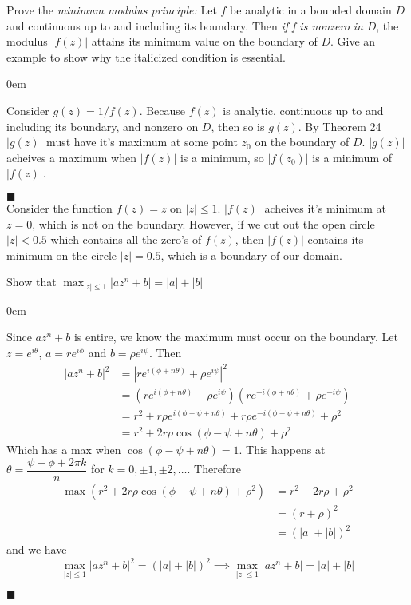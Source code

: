 \documentclass[12pt]{article}
\author{Warren Atkison}
\date{\today}
\renewcommand{\qed}{\hfill$\blacksquare$}
\renewenvironment{proof}{\vspace{1em}\begin{addmargin}[2em]{0em}\begin{newproof}}{\end{newproof}\end{addmargin}\qed}
\newenvironment{exercise}[2][Exercise]{\begin{trivlist}
\item[\hskip \labelsep {\bfseries #1} \hskip \labelsep {\bfseries #2.}]}{\end{trivlist}}
\begin{document}
\fancyhf{}
\fancyhead[R]{\today}
\fancyfoot[R]{\thepage}

\begin{exercise}{4.6.14}
	Prove the \textit{minimum modulus principle:} Let $f$ be analytic in a bounded domain $D$ and continuous up to and including its boundary. Then \textit{if f is nonzero in} $D$, the modulus $|f(z)|$ attains its minimum value on the boundary of $D$. Give an example to show why the italicized condition is essential.
\end{exercise}
\begin{proof}
	Consider $g(z) = 1/f(z)$. Because $f(z)$ is analytic, continuous up to and including its boundary, and nonzero on $D$, then so is $g(z)$. By Theorem 24 $|g(z)|$ must have it's maximum at some point $z_0$ on the boundary of $D$. $|g(z)|$ acheives a maximum when $|f(z)|$ is a minimum, so $|f(z_0)|$ is a minimum of $|f(z)|$.
\end{proof} \\
Consider the function $f(z) = z$ on $|z| \le 1$. $|f(z)|$ acheives it's minimum at $z = 0$, which is not on the boundary. However, if we cut out the open circle $|z| < 0.5$ which contains all the zero's of $f(z)$, then $|f(z)|$ contains its minimum on the circle $|z| = 0.5$, which is a boundary of our domain.
\begin{exercise}{4.6.16}
	Show that $\max_{|z| \le 1} |az^n + b| = |a| + |b|$
\end{exercise}
\begin{proof}
	Since $az^n + b$ is entire, we know the maximum must occur on the boundary. Let $z = e^{i\theta}$, $a = re^{i\phi}$ and $b = \rho e^{i\psi}$. Then
	\begin{align*}
		|az^n + b|^2 &= |re^{i(\phi + n\theta)} + \rho e^{i\psi}|^2 \\
			     &= (re^{i(\phi + n\theta)} + \rho e^{i\psi})(re^{-i(\phi + n\theta)} + \rho e^{-i\psi}) \\
			     &= r^2 + r\rho e^{i(\phi - \psi + n\theta)} + r\rho e^{-i(\phi - \psi + n\theta)} + \rho^2 \\
			     &= r^2 + 2r\rho \cos(\phi - \psi + n\theta) + \rho^2
	\end{align*}
	Which has a max when $\cos(\phi - \psi + n\theta) = 1$. This happens at $\theta = \dfrac{\psi - \phi + 2\pi k}{n}$ for $k=0,\pm1,\pm2,\ldots$. Therefore
	\begin{align*}
		\max (r^2 + 2r\rho \cos(\phi - \psi + n\theta) + \rho^2) &= r^2 + 2r\rho + \rho^2 \\
									 &= (r + \rho)^2 \\
									 &= (|a| + |b|)^2
	\end{align*}
	and we have
	\[
		\max_{|z| \le 1} |az^n + b|^2 = (|a| + |b|)^2 \implies \max_{|z| \le 1} |az^n + b| = |a| + |b|
	\]
\end{proof}
\end{document}
